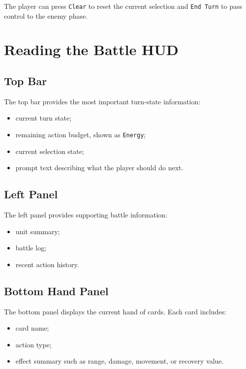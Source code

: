 The player can press \texttt{Clear} to reset the current selection and \texttt{End Turn} to pass control to the enemy phase.

\section{Reading the Battle HUD}

\subsection{Top Bar}

The top bar provides the most important turn-state information:

\begin{itemize}
    \item current turn state;
    \item remaining action budget, shown as \texttt{Energy};
    \item current selection state;
    \item prompt text describing what the player should do next.
\end{itemize}

\subsection{Left Panel}

The left panel provides supporting battle information:

\begin{itemize}
    \item unit summary;
    \item battle log;
    \item recent action history.
\end{itemize}

\subsection{Bottom Hand Panel}

The bottom panel displays the current hand of cards. Each card includes:

\begin{itemize}
    \item card name;
    \item action type;
    \item effect summary such as range, damage, movement, or recovery value.
\end{itemize}

